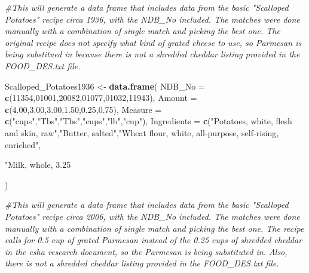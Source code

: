 \documentclass[]{article}
\newenvironment{Shaded}{\begin{snugshade}}{\end{snugshade}}
\newcommand{\KeywordTok}[1]{\textcolor[rgb]{0.13,0.29,0.53}{\textbf{#1}}}
\newcommand{\DataTypeTok}[1]{\textcolor[rgb]{0.13,0.29,0.53}{#1}}
\newcommand{\DecValTok}[1]{\textcolor[rgb]{0.00,0.00,0.81}{#1}}
\newcommand{\FloatTok}[1]{\textcolor[rgb]{0.00,0.00,0.81}{#1}}
\newcommand{\StringTok}[1]{\textcolor[rgb]{0.31,0.60,0.02}{#1}}
\newcommand{\CommentTok}[1]{\textcolor[rgb]{0.56,0.35,0.01}{\textit{#1}}}
\newcommand{\NormalTok}[1]{#1}
\begin{document}
\begin{Shaded}
\begin{Highlighting}[]
{{\CommentTok{#This will generate a data frame that includes data from the basic "Scalloped Potatoes" recipe circa 1936, with the NDB_No included.  The matches were done manually with a combination of single match and picking the best one. The original recipe does not specify what kind of grated cheese to use, so Parmesan is being substitued in because there is not a shredded cheddar listing provided in the FOOD_DES.txt file.}

\NormalTok{Scalloped_Potatoes1936 <-}\StringTok{ }\KeywordTok{data.frame}\NormalTok{(}
  \DataTypeTok{NDB_No =} \KeywordTok{c}\NormalTok{(}\DecValTok{11354}\NormalTok{,}\DecValTok{01001}\NormalTok{,}\DecValTok{20082}\NormalTok{,}\DecValTok{01077}\NormalTok{,}\DecValTok{01032}\NormalTok{,}\DecValTok{11943}\NormalTok{),}
  \DataTypeTok{Amount =} \KeywordTok{c}\NormalTok{(}\FloatTok{4.00}\NormalTok{,}\FloatTok{3.00}\NormalTok{,}\FloatTok{3.00}\NormalTok{,}\FloatTok{1.50}\NormalTok{,}\FloatTok{0.25}\NormalTok{,}\FloatTok{0.75}\NormalTok{),}
  \DataTypeTok{Measure =} \KeywordTok{c}\NormalTok{(}\StringTok{"cups"}\NormalTok{,}\StringTok{"Tbs"}\NormalTok{,}\StringTok{"Tbs"}\NormalTok{,}\StringTok{"cups"}\NormalTok{,}\StringTok{"lb"}\NormalTok{,}\StringTok{"cup"}\NormalTok{),}
  \DataTypeTok{Ingredients =} \KeywordTok{c}\NormalTok{(}\StringTok{"Potatoes, white, flesh and skin, raw"}\NormalTok{,}\StringTok{"Butter, salted"}\NormalTok{,}\StringTok{"Wheat flour, white, all-purpose, self-rising, enriched"}\NormalTok{,}\StringTok{"Milk, whole, 3.25% milkfat, with added vitamin D"}\NormalTok{,}\StringTok{"Cheese, parmesan, grated"}\NormalTok{,}\StringTok{"Pimento, canned"}\NormalTok{)}

\NormalTok{)}

\CommentTok{#This will generate a data frame that includes data from the basic "Scalloped Potatoes" recipe circa 2006, with the NDB_No included.  The matches were done manually with a combination of single match and picking the best one. The recipe calls for 0.5 cup of grated Parmesan instead of the 0.25 cups of shredded cheddar in the esha research document, so the Parmesan is being substituted in. Also, there is not a shredded cheddar listing provided in the FOOD_DES.txt file.}

}}}
\end{Highlighting}
\end{Shaded}
\end{document}
